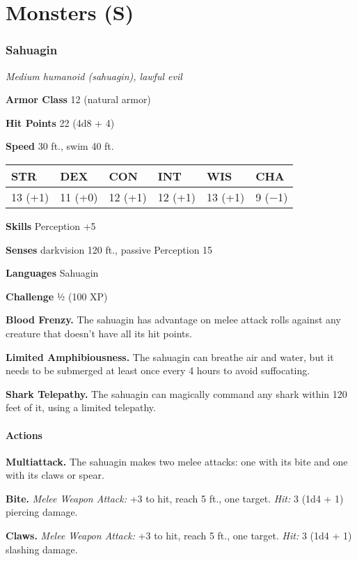 \documentclass[
]{article}
\date{}
\begin{document}
\hypertarget{monsters-s}{%
\section{Monsters (S)}\label{monsters-s}}

\hypertarget{sahuagin}{%
\subsubsection{Sahuagin}\label{sahuagin}}

\emph{Medium humanoid (sahuagin), lawful evil}

\textbf{Armor Class} 12 (natural armor)

\textbf{Hit Points} 22 (4d8 + 4)

\textbf{Speed} 30 ft., swim 40 ft.

\begin{longtable}[]{@{}llllll@{}}
\toprule
STR & DEX & CON & INT & WIS & CHA\tabularnewline
\midrule
\endhead
13 (+1) & 11 (+0) & 12 (+1) & 12 (+1) & 13 (+1) & 9 (−1)\tabularnewline
\bottomrule
\end{longtable}

\textbf{Skills} Perception +5

\textbf{Senses} darkvision 120 ft., passive Perception 15

\textbf{Languages} Sahuagin

\textbf{Challenge} ½ (100 XP)

\textbf{Blood Frenzy.} The sahuagin has advantage on melee attack rolls
against any creature that doesn't have all its hit points.

\textbf{Limited Amphibiousness.} The sahuagin can breathe air and water,
but it needs to be submerged at least once every 4 hours to avoid
suffocating.

\textbf{Shark Telepathy.} The sahuagin can magically command any shark
within 120 feet of it, using a limited telepathy.

\hypertarget{actions}{%
\paragraph{Actions}\label{actions}}

\textbf{Multiattack.} The sahuagin makes two melee attacks: one with its
bite and one with its claws or spear.

\textbf{Bite.} \emph{Melee Weapon Attack:} +3 to hit, reach 5 ft., one
target. \emph{Hit:} 3 (1d4 + 1) piercing damage.

\textbf{Claws.} \emph{Melee Weapon Attack:} +3 to hit, reach 5 ft., one
target. \emph{Hit:} 3 (1d4 + 1) slashing damage.
\end{document}
